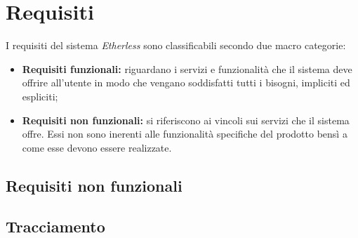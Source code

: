 \section{Requisiti}
I requisiti del sistema \textit{Etherless} sono classificabili secondo due macro categorie:
\begin{itemize}
	\item \textbf{Requisiti funzionali:} riguardano i servizi e funzionalità che il sistema deve offrire all'utente in modo che vengano soddisfatti tutti i bisogni, impliciti ed espliciti;
	\item \textbf{Requisiti non funzionali:} si riferiscono ai vincoli sui servizi che il sistema offre. Essi non sono inerenti alle funzionalità specifiche del prodotto bensì a come esse devono essere realizzate.
\end{itemize}


\newpage
\subsection{Requisiti non funzionali}

\newpage


\newpage
\subsection{Tracciamento}



